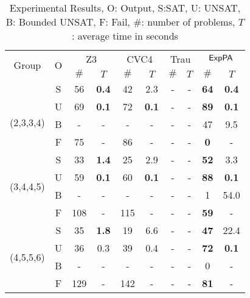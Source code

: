 \begin{table}[ht]
        \caption{Experimental Results, O: Output, S:SAT, U: UNSAT, B: Bounded UNSAT, F: Fail, 
    $\#$: number of problems, $T$: average time in seconds}
    \centering
    \renewcommand{\arraystretch}{1.1}
    \begin{tabular}{|c|c|c|c|c|c|c|c|c|c|}
    \hline
        \multirow{2}{*}{Group }  & \multirow{2}{*}{O} & \multicolumn{2}{c|}{Z3} & \multicolumn{2}{c|}{CVC4} &  \multicolumn{2}{c|}{Trau} & \multicolumn{2}{c|}{${\sf ExpPA}$} \\
        \cline{3-10}
        &  & \scriptsize{$\#$} & \scriptsize{$T$}  & \scriptsize{$\#$} & \scriptsize{$T$}  & \scriptsize{$\#$} & \scriptsize{$T$} & \scriptsize{$\#$} & \scriptsize{$T$}  \\ \hline
        \multirow{4}{*}{
        \newline \scriptsize{(2,3,3,4)}} & S & 56 & {\bf 0.4} & 42 & 2.3 & - & - &  {\bf 64} & {\bf 0.4} \\
        \cline{2-10}
         & U & 69 & {\bf 0.1} & 72 &  {\bf 0.1} & - & - &  {\bf 89} & {\bf 0.1} \\
         \cline{2-10}
         & B & - & - & - & - & - & - &  47 & 9.5 \\
         \cline{2-10}
         & F & 75 & - & 86 & - & - & - &  {\bf 0} & - \\ \hline
         \cline{1-10}
        \multirow{4}{*}{\scriptsize{(3,4,4,5)}} & S & 33 & {\bf 1.4} & 25 & 2.9 & - & - &  {\bf 52} & 3.3 \\
        \cline{2-10}
         & U & 59 & {\bf 0.1} & 60 & {\bf 0.1} & - & - &  {\bf 88} & {\bf 0.1} \\
         \cline{2-10}
         & B & -  & - &  - & -  & - & - &  1 & 54.0 \\
         \cline{2-10}
         & F & 108 & - & 115 & - & - & - &  {\bf 59} & - \\ \hline
         \cline{1-10}
        \multirow{4}{*}{\scriptsize{(4,5,5,6)}} & S & 35 & {\bf 1.8} & 19 & 6.6 & - & - &  {\bf 47} & 22.4 \\
        \cline{2-10}
         & U & 36 & 0.3 & 39 & 0.4 & - & - &  {\bf 72} & {\bf 0.1} \\
         \cline{2-10}
         & B & -  & -  & - & - & - & - &  0 & - \\
         \cline{2-10}
         & F & 129 & - & 142 & - & - & - &  {\bf 81} & -\\

\end{tabular}
\end{table}
